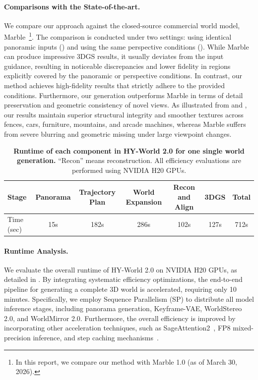 \documentclass{article} %
\begin{document}
\paragraph{Comparisons with the State-of-the-art.}
We compare our approach against the closed-source commercial world model, Marble~\cite{marble_worldlabs_2026}\footnote{In this report, we compare our method with Marble 1.0 (as of March 30, 2026).}.
The comparison is conducted under two settings: using identical panoramic inputs () and using the same perspective conditions ().
While Marble can produce impressive 3DGS results, it usually deviates from the input guidance, resulting in noticeable discrepancies and lower fidelity in regions explicitly covered by the panoramic or perspective conditions.
In contrast, our method achieves high-fidelity results that strictly adhere to the provided conditions. Furthermore, our generation outperforms Marble in terms of detail preservation and geometric consistency of novel views. 
As illustrated from  and , our results maintain superior structural integrity and smoother textures across fences, cars, furniture, mountains, and arcade machines, whereas Marble suffers from severe blurring and geometric missing under large viewpoint changes.

\begin{table}
\centering
\caption{\textbf{Runtime of each component in HY-World 2.0 for one single world generation.} ``Recon'' means reconstruction. All efficiency evaluations are performed using NVIDIA H20 GPUs. \label{tab:time_cost_worldgen}}
\small
\begin{tabular}{lcccccc}
\toprule
Stage & Panorama & Trajectory Plan & World Expansion & Recon and Align & 3DGS & Total\tabularnewline
\midrule
Time (sec) & 15s & 182s & 286s & 102s & 127s & 712s\tabularnewline
\bottomrule
\end{tabular}
\end{table}

\paragraph{Runtime Analysis.}
We evaluate the overall runtime of HY-World 2.0 on NVIDIA H20 GPUs, as detailed in . By integrating systematic efficiency optimizations, the end-to-end pipeline for generating a complete 3D world is accelerated, requiring only 10 minutes. Specifically, we employ Sequence Parallelism (SP) to distribute all model inference stages, including panorama generation, Keyframe-VAE, WorldStereo 2.0, and WorldMirror 2.0. Furthermore, the overall efficiency is improved by incorporating other acceleration techniques, such as SageAttention2~\cite{zhang2025sageattention2}, FP8 mixed-precision inference, and step caching mechanisms~\cite{liu2025survey}.
\end{document}
